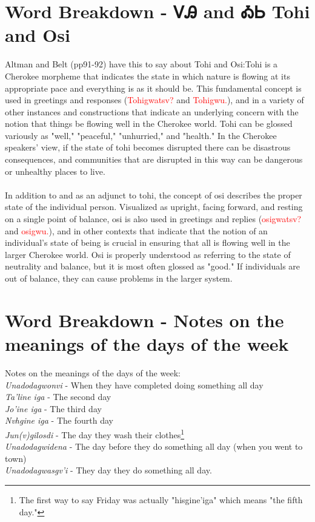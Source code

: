 \label{sec:wordBreakdownTohiOsi}\section{Word Breakdown - ᏙᎯ and ᎣᏏ Tohi and Osi}Altman and Belt (pp91-92) have this to say about Tohi and Osi:Tohi is a Cherokee morpheme that indicates the state in which nature is flowing at its appropriate pace and everything is as it should be. This fundamental concept is used in greetings and responses (\textcolor{red}{Tohigwatsv?} and \textcolor{red}{Tohigwu.}), and in a variety of other instances and constructions that indicate an underlying concern with the notion that things be flowing well in the Cherokee world. Tohi can be glossed variously as "well," "peaceful," "unhurried," and "health." In the Cherokee speakers' view, if the state of tohi becomes disrupted there can be disastrous consequences, and communities that are disrupted in this way can be dangerous or unhealthy places to live.\\
\\
In addition to and as an adjunct to tohi, the concept of osi describes the proper state of the individual person. Visualized as upright, facing forward, and resting on a single point of balance, osi is also used in greetings and replies (\textcolor{red}{osigwatsv?} and \textcolor{red}{osigwu.}), and in other contexts that indicate that the notion of an individual’s state of being is crucial in ensuring that all is flowing well in the larger Cherokee world. Osi is properly understood as referring to the state of neutrality and balance, but it is most often glossed as "good." If individuals are out of balance, they can cause problems in the larger system.\cite{altmanBelt90-98}

\label{sec:daysOfWeekMeaning}\section{Word Breakdown - Notes on the meanings of the days of the week}Notes on the meanings of the days of the week:\cite{walc1pp46}\\
\textit{Unadodagwonvi} - When they have completed doing something all day\\
\textit{Ta’line iga} - The second day\\
\textit{Jo’ine iga} - The third day\\
\textit{Nvhgine iga} - The fourth day\\
\textit{Jun(v)gilosdi} - The day they wash their clothes\footnote{The first way to say Friday was actually "hisgine'iga" which means "the fifth day."}\\
\textit{Unadodagwidena} - The day before they do something all day (when you went to town)\\
\textit{Unadodagwasgv’i} - They day they do something all day.